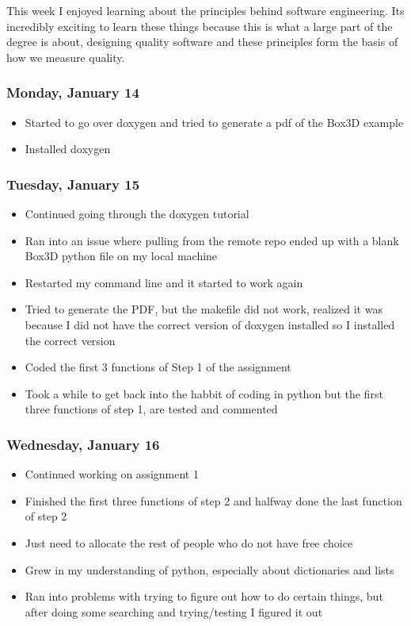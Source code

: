 \documentclass{article}
\begin{document}
This week I enjoyed learning about the principles behind software engineering. Its incredibly exciting to learn these things because this is what a large part of the degree is about, designing quality software and these principles form the basis of how we measure quality.

\subsubsection{Monday, January 14}
\begin{itemize}
    \item Started to go over doxygen and tried to generate a pdf of the Box3D example
    \item Installed doxygen
\end{itemize}

\subsubsection{Tuesday, January 15}
\begin{itemize}
    \item Continued going through the doxygen tutorial
    \item Ran into an issue where pulling from the remote repo ended up with a blank Box3D python file on my local machine
    \item Restarted my command line and it started to work again
    \item Tried to generate the PDF, but the makefile did not work, realized it was because I did not have the correct version of doxygen installed so I installed the correct version
    \item Coded the first 3 functions of Step 1 of the assignment
    \item Took a while to get back into the habbit of coding in python but the first three functions of step 1, are tested and commented
\end{itemize}

\subsubsection{Wednesday, January 16}
\begin{itemize}
    \item Continued working on assignment 1
    \item Finished the first three functions of step 2 and halfway done the last function of step 2
    \item Just need to allocate the rest of people who do not have free choice
    \item Grew in my understanding of python, especially about dictionaries and lists
    \item Ran into problems with trying to figure out how to do certain things, but after doing some searching and trying/testing I figured it out
\end{itemize}
\end{document}

